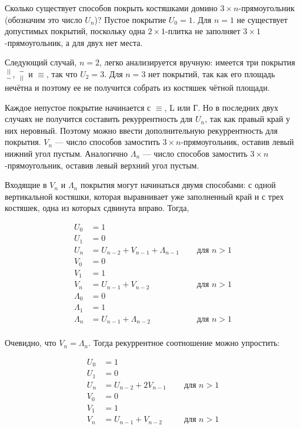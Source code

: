 \documentclass[14pt]{book}
\begin{document}
Сколько существует способов покрыть костяшками домино $3 \times n$-прямоугольник
(обозначим это число $U_n$)? Пустое покрытие $U_0 = 1$. Для $n=1$ не существует допустимых
покрытий, поскольку одна $2\times 1$-плитка не заполняет $3 \times 1$-прямоугольник,
а для двух нет места.

Следующий случай, $n=2$, легко анализируется вручную: имеется три покрытия ${||}\atop{-}$,
${-}\atop{||}$ и $\equiv$, так что $U_2 = 3$. Для $n=3$ нет покрытий, так как его
площадь нечётна и поэтому ее не получится собрать из костяшек чётной площади.

Каждое непустое покрытие начинается с $\equiv$, L или Г. Но в последних двух случаях
не получится составить рекуррентность для $U_n$, так как правый край у них неровный.
Поэтому можно ввести дополнительную рекуррентность для покрытия. $V_n$  --- число
способов замостить $3\times n$-прямоугольник, оставив левый нижний угол пустым.
Аналогично $\Lambda_n$ --- число
способов замостить $3\times n$-прямоугольник, оставив левый верхний угол пустым.

Входящие в $V_n$ и $\Lambda_n$ покрытия могут начинаться двумя способами: с одной вертикальной
костяшки, которая выравнивает уже заполненный край и с трех костяшек, одна из которых сдвинута вправо.
Тогда,

\begin{align*}
U_0 &= 1 \\
U_1 &= 0 \\
U_n &= U_{n-2} + V_{n-1} + \Lambda_{n-1} \quad & \text{ для $n>1$}\\
V_0 &= 0 \\
V_1 &= 1 \\
V_n &= U_{n-1} + V_{n-2} & \text{ для $n>1$}\\
\Lambda_0 &= 0 \\
\Lambda_1 &= 1 \\
\Lambda_n &= U_{n-1} + \Lambda_{n-2} & \text{ для $n>1$}\\
\end{align*}

Очевидно, что $V_n = \Lambda_n$. Тогда рекуррентное соотношение можно упростить:

\begin{align*}
U_0 &= 1 \\
U_1 &= 0 \\
U_n &= U_{n-2} + 2V_{n-1} \quad & \text{ для $n>1$}\\
V_0 &= 0 \\
V_1 &= 1 \\
V_n &= U_{n-1} + V_{n-2} & \text{ для $n>1$}\\
\end{align*}
\end{document}
